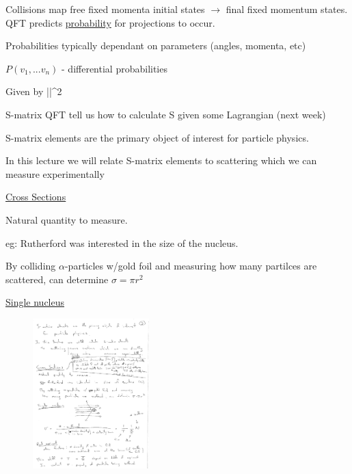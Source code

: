 {Collisions map free fixed momenta initial states $\rightarrow$ final fixed momentum states. \\

QFT predicts \underline{probability} for projections to occur. 

Probabilities typically dependant on parameters (angles, momenta, etc) 

\begin{center}
$P(v_1, ... v_n)$ - differential probabilities
\end{center}

Given by 
\be
||^2
\ee


\be
{} \hspace{1in} \textrm{S-matrix}
\ee
QFT tell us how to calculate S given some Lagrangian (next week)

S-matrix elements are the primary object of interest for particle physics. 

In this lecture we will relate S-matrix elements to scattering 
which we can measure experimentally

\clearpage

\underline{\underline{Cross Sections}}


Natural quantity to measure. 

eg: Rutherford was interested in the size of the nucleus. 

By colliding $\alpha$-particles w/gold foil and measuring how many partilces are scattered, can determine $\sigma = \pi r^2$

\underline{Single nucleus}
\begin{figure}[h]
\centering
\includegraphics[width=0.4\textwidth]{./Scattering}
\end{figure}

}

